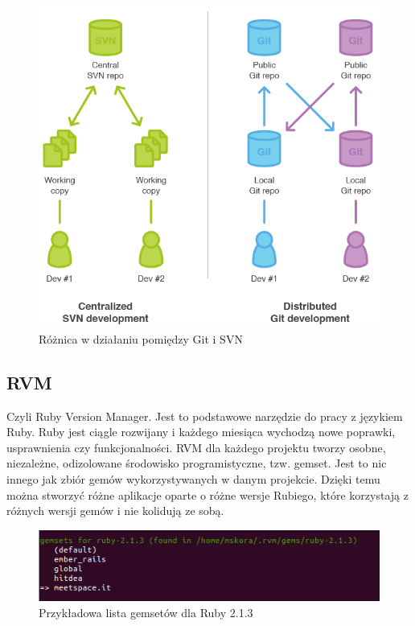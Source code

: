   \begin{figure}
    \centering
    \includegraphics[scale=0.45]{images/gitsvn.png}
    \caption{Różnica w działaniu pomiędzy Git i SVN}
  \end{figure}

  \subsection{RVM}
  Czyli Ruby Version Manager. Jest to podstawowe narzędzie do pracy z językiem Ruby. Ruby jest ciągle rozwijany i każdego miesiąca wychodzą nowe poprawki, usprawnienia czy funkcjonalności. RVM dla każdego projektu tworzy osobne, niezależne, odizolowane środowisko programistyczne, tzw. gemset. Jest to nic innego jak zbiór gemów wykorzystywanych w danym projekcie. Dzięki temu można stworzyć różne aplikacje oparte o różne wersje Rubiego, które korzystają z różnych wersji gemów i nie kolidują ze sobą.
  \begin{figure}[h]
  \centering
  \includegraphics[scale=0.84]{images/rvm.png}
  \caption{Przykładowa lista gemsetów dla Ruby 2.1.3}
  \end{figure}

